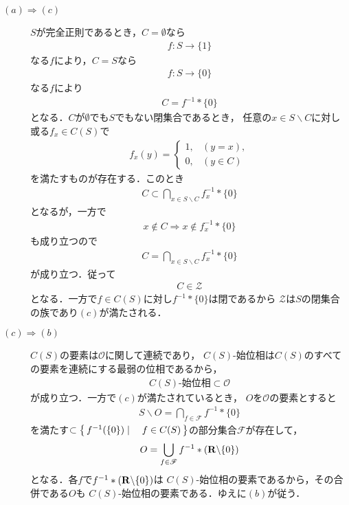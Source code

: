 	\begin{prf}\mbox{}
		\begin{description}
			\item[$(a) \Longrightarrow (c)$]
				$S$が完全正則であるとき，$C=\emptyset$なら
				\begin{align}
					f:S \longrightarrow \{1\}
				\end{align}
				なる$f$により，$C = S$なら
				\begin{align}
					f:S \longrightarrow \{0\}
				\end{align}
				なる$f$により
				\begin{align}
					C = f^{-1} \ast \{0\}
				\end{align}
				となる．$C$が$\emptyset$でも$S$でもない閉集合であるとき，
				任意の$x \in S \backslash C$に対し或る$f_x \in C(S)$で
				\begin{align}
					f_x(y) = \begin{cases}
						1, & (y=x),\\
						0, & (y \in C)
					\end{cases}
				\end{align}
				を満たすものが存在する．このとき
				\begin{align}
					C \subset \bigcap_{x \in S \backslash C} f_x^{-1} \ast \{0\}
				\end{align}
				となるが，一方で
				\begin{align}
					x \notin C \Longrightarrow x \notin f_x^{-1} \ast \{0\}
				\end{align}
				も成り立つので
				\begin{align}
					C = \bigcap_{x \in S \backslash C} f_x^{-1} \ast \{0\}
				\end{align}
				が成り立つ．従って
				\begin{align}
					C \in \mathscr{Z}
				\end{align}
				となる．一方で$f \in C(S)$に対し$f^{-1} \ast \{0\}$は閉であるから
				$\mathscr{Z}$は$S$の閉集合の族であり$(c)$が満たされる．
				
			\item[$(c) \Longrightarrow (b)$]
				$C(S)$の要素は$\mathscr{O}$に関して連続であり，
				$C(S)$-始位相は$C(S)$のすべての要素を連続にする最弱の位相であるから，
				\begin{align}
					\mbox{$C(S)$-始位相} \subset \mathscr{O}
				\end{align}
				が成り立つ．一方で$(c)$が満たされているとき，
				$O$を$\mathscr{O}$の要素とすると
				\begin{align}
					S \backslash O = \bigcap_{f \in \mathscr{F}} f^{-1}\ast\{0\}
				\end{align}
				を満たす$\subset \left\{\, f^{-1}(\{0\}) \mid \quad f \in C(S)\, \right\}$の部分集合$\mathscr{F}$が存在して，
				\begin{align}
					O = \bigcup_{f \in \mathscr{F}} f^{-1} \ast (\mathbf{R} \backslash \{0\})
				\end{align}
				となる．各$f$で$f^{-1} \ast (\mathbf{R} \backslash \{0\})$は
				$C(S)$-始位相の要素であるから，その合併である$O$も
				$C(S)$-始位相の要素である．ゆえに$(b)$が従う．
			

\end{description}
\end{prf}
